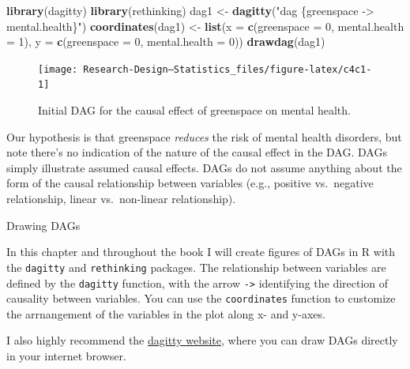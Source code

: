 \documentclass[
]{book}
\newenvironment{Shaded}{\begin{snugshade}}{\end{snugshade}}
\newcommand{\AttributeTok}[1]{\textcolor[rgb]{0.13,0.29,0.53}{#1}}
\newcommand{\DecValTok}[1]{\textcolor[rgb]{0.00,0.00,0.81}{#1}}
\newcommand{\FunctionTok}[1]{\textcolor[rgb]{0.13,0.29,0.53}{\textbf{#1}}}
\newcommand{\NormalTok}[1]{#1}
\newcommand{\OtherTok}[1]{\textcolor[rgb]{0.56,0.35,0.01}{#1}}
\newcommand{\StringTok}[1]{\textcolor[rgb]{0.31,0.60,0.02}{#1}}
\begin{document}
\begin{Shaded}
\begin{Highlighting}[]
\FunctionTok{library}\NormalTok{(dagitty)}
\FunctionTok{library}\NormalTok{(rethinking)}
\NormalTok{dag1 }\OtherTok{\textless{}{-}} \FunctionTok{dagitty}\NormalTok{(}\StringTok{"dag \{greenspace {-}\textgreater{} mental.health\}"}\NormalTok{)}
\FunctionTok{coordinates}\NormalTok{(dag1) }\OtherTok{\textless{}{-}} \FunctionTok{list}\NormalTok{(}\AttributeTok{x =} \FunctionTok{c}\NormalTok{(}\AttributeTok{greenspace =} \DecValTok{0}\NormalTok{, }\AttributeTok{mental.health =} \DecValTok{1}\NormalTok{), }\AttributeTok{y =} \FunctionTok{c}\NormalTok{(}\AttributeTok{greenspace =} \DecValTok{0}\NormalTok{, }\AttributeTok{mental.health =} \DecValTok{0}\NormalTok{))}
\FunctionTok{drawdag}\NormalTok{(dag1)}
\end{Highlighting}
\end{Shaded}

\begin{figure}

{\centering \texttt{[image: Research-Design---Statistics\_files/figure-latex/c4c1-1]} 

}

\caption{Initial DAG for the causal effect of greenspace on mental health.}\label{fig:c4c1}
\end{figure}

Our hypothesis is that greenspace \emph{reduces} the risk of mental health disorders, but note there's no indication of the nature of the causal effect in the DAG. DAGs simply illustrate assumed causal effects. DAGs do not assume anything about the form of the causal relationship between variables (e.g., positive vs.~negative relationship, linear vs.~non-linear relationship).

Drawing DAGs

In this chapter and throughout the book I will create figures of DAGs in R with the \texttt{dagitty} and \texttt{rethinking} packages. The relationship between variables are defined by the \texttt{dagitty} function, with the arrow \texttt{-\textgreater{}} identifying the direction of causality between variables. You can use the \texttt{coordinates} function to customize the arrnangement of the variables in the plot along x- and y-axes.

I also highly recommend the \href{https://www.dagitty.net/}{dagitty website}, where you can draw DAGs directly in your internet browser.
\end{document}

